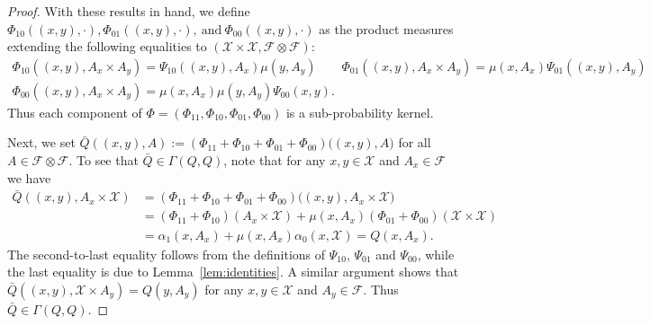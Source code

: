\documentclass[aihp]{imsart}
\theoremstyle{plain}
\theoremstyle{remark}
\theoremstyle{definition} \newtheorem{example}{Example}
\newcommand{\eq}[1]{\begin{align*}#1\end{align*}} %
\newcommand{\ec}[1]{\begin{gather*}#1\end{gather*}} %
\newcommand{\scrF}{\mathscr{F}}
\newcommand{\calX}{\mathcal{X}}
\newcommand{\sas}{\ \text{and} \ }
\newcommand{\calXp}{\calX \times \calX}
\newcommand{\scrFp}{\scrF \otimes \scrF}
\newcommand{\bq}{\bar Q}
\newcommand{\xy}{(x,y)}
\newcommand{\axy}{A_x \times A_y}
\begin{document}
\begin{proof}
With these results in hand, we define $\Phi_{10}(\xy, \cdot), \Phi_{01}(\xy, \cdot), \sas
\Phi_{00}(\xy, \cdot)$ as the product measures extending the following equalities to $(\calX \times
\calX, \scrF \otimes \scrF)$:
\ec{
	\Phi_{10}(\xy, A_x \times A_y) = \Psi_{10}(\xy,  A_x) \mu(y, A_y) \qquad
	\Phi_{01}(\xy, A_x \times A_y) = \mu(x, A_x) \Psi_{01}(\xy, A_y) \\
	\Phi_{00}(\xy, \axy) = \mu(x, A_x) \mu(y, A_y) \Psi_{00}(x,y).
}
Thus each component of $\Phi = (\Phi_{11}, \Phi_{10}, \Phi_{01}, \Phi_{00})$ is a sub-probability kernel.

Next, we set $\bq(\xy, A) := (\Phi_{11}+\Phi_{10}+\Phi_{01}+\Phi_{00})\big(\xy, A \big)$ for all $A
\in \scrFp$. To see that $\bq \in \Gamma(Q,Q)$, note that for any $x,y \in \calX$ and $A_x \in \scrF$ we have
\eq{
	\bq(\xy, A_x \times \calX)
	& = (\Phi_{11}+\Phi_{10}+\Phi_{01}+\Phi_{00})\big(\xy, A_x \times \calX \big) \\
	& = (\Phi_{11} + \Phi_{10})(A_x \times \calX) + \mu(x, A_x) (\Phi_{01} + \Phi_{00})(\calXp) \\
	& = \alpha_1(x,A_x) + \mu(x, A_x) \alpha_0(x, \calX) = Q(x, A_x).
}
The second-to-last equality follows from the definitions of $\Psi_{10}$, $\Psi_{01}$ and
$\Psi_{00}$, while the last equality is due to Lemma~\ref{lem:identities}. A similar argument shows
that $\bq(\xy, \calX \times A_y) = Q(y, A_y)$ for any $x,y \in \calX$ and $A_y \in \scrF$. Thus $\bq
\in \Gamma(Q,Q)$.


\end{proof}
\end{document}
